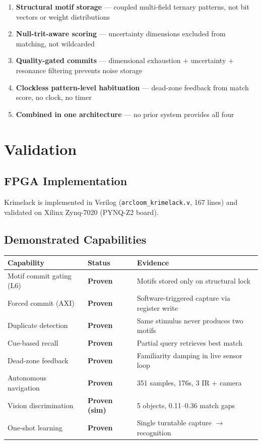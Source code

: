 \documentclass[11pt, a4paper]{article}
\begin{document}
\begin{enumerate}[nosep]
  \item \textbf{Structural motif storage} --- coupled multi-field
        ternary patterns, not bit vectors or weight distributions
  \item \textbf{Null-trit-aware scoring} --- uncertainty dimensions
        excluded from matching, not wildcarded
  \item \textbf{Quality-gated commits} --- dimensional exhaustion
        + uncertainty + resonance filtering prevents noise storage
  \item \textbf{Clockless pattern-level habituation} --- dead-zone
        feedback from match score, no clock, no timer
  \item \textbf{Combined in one architecture} --- no prior system
        provides all four
\end{enumerate}

\section{Validation}

\subsection{FPGA Implementation}

Krimelack is implemented in Verilog
(\texttt{arcloom\_krimelack.v}, 167 lines) and validated on
Xilinx Zynq-7020 (PYNQ-Z2 board).

\subsection{Demonstrated Capabilities}

\begin{center}
\begin{tabular}{@{}lll@{}}
\toprule
\textbf{Capability} & \textbf{Status} & \textbf{Evidence} \\
\midrule
Motif commit gating (L6) & \textbf{Proven} & Motifs stored only on
  structural lock \\
Forced commit (AXI) & \textbf{Proven} & Software-triggered capture
  via register write \\
Duplicate detection & \textbf{Proven} & Same stimulus never produces
  two motifs \\
Cue-based recall & \textbf{Proven} & Partial query retrieves best
  match \\
Dead-zone feedback & \textbf{Proven} & Familiarity damping in live
  sensor loop \\
Autonomous navigation & \textbf{Proven} & 351 samples, 176s,
  3 IR + camera \\
Vision discrimination & \textbf{Proven (sim)} & 5 objects,
  0.11--0.36 match gaps \\
One-shot learning & \textbf{Proven} & Single turntable capture
  $\to$ recognition \\
\bottomrule
\end{tabular}
\end{center}
\end{document}
